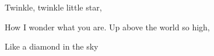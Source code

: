 Twinkle, twinkle little star,\par
How I wonder what you are.\bigskip
Up above the world so high,\par
Like a diamond in the sky\par
\bye

